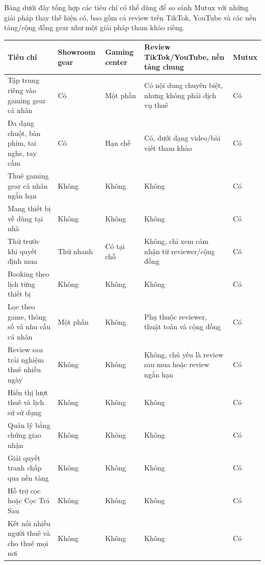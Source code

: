 Bảng dưới đây tổng hợp các tiêu chí có thể dùng để so sánh Mutux với những giải pháp thay thế hiện có, bao gồm cả review trên TikTok, YouTube và các nền tảng/cộng đồng gear như một giải pháp tham khảo riêng. 



\begin{table}[H]
    \centering
    \footnotesize
    \renewcommand{\arraystretch}{1.28}
    \setlength{\tabcolsep}{4pt}
    \begin{tabular}{|p{4.4cm}|p{2.5cm}|p{2.5cm}|p{3.2cm}|p{2.2cm}|}
        \hline
        \textbf{Tiêu chí} & \textbf{Showroom gear} & \textbf{Gaming center} & \textbf{Review TikTok/YouTube, nền tảng chung} & \textbf{Mutux} \\
        \hline
        Tập trung riêng vào gaming gear cá nhân & Có & Một phần & Có nội dung chuyên biệt, nhưng không phải dịch vụ thuê & Có \\
        \hline
        Đa dạng chuột, bàn phím, tai nghe, tay cầm & Có & Hạn chế & Có, dưới dạng video/bài viết tham khảo & Có \\
        \hline
        Thuê gaming gear cá nhân ngắn hạn & Không & Không & Không & Có \\
        \hline
        Mang thiết bị về dùng tại nhà & Không & Không & Không & Có \\
        \hline
        Thử trước khi quyết định mua & Thử nhanh & Có tại chỗ & Không, chỉ xem cảm nhận từ reviewer/cộng đồng & Có \\
        \hline
        Booking theo lịch từng thiết bị & Không & Không & Không & Có \\
        \hline
        Lọc theo game, thông số và nhu cầu cá nhân & Một phần & Không & Phụ thuộc reviewer, thuật toán và cộng đồng & Có \\
        \hline
        Review sau trải nghiệm thuê nhiều ngày & Không & Không & Không, chủ yếu là review sau mua hoặc review ngắn hạn & Có \\
        \hline
        Hiển thị lượt thuê và lịch sử sử dụng & Không & Không & Không & Có \\
        \hline
        Quản lý bằng chứng giao nhận & Không & Không & Không & Có \\
        \hline
        Giải quyết tranh chấp qua nền tảng & Không & Không & Không & Có \\
        \hline
        Hỗ trợ cọc hoặc Cọc Trả Sau & Không & Không & Không & Có \\
        \hline
        Kết nối nhiều người thuê và cho thuê mọi nơi & Không & Không & Không & Có \\

\end{tabular}
\end{table}
